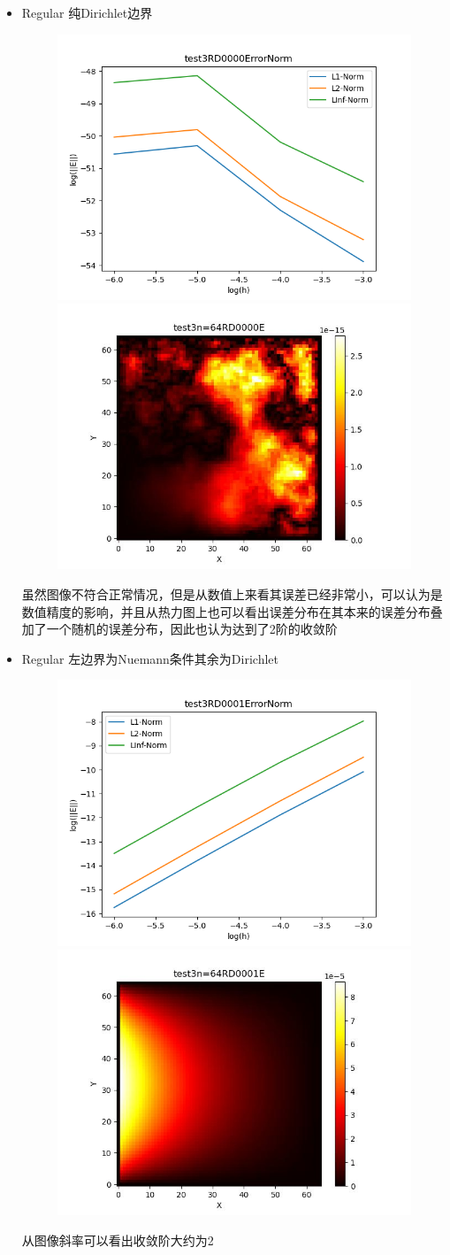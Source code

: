 \documentclass{article}
\begin{document}
\begin{itemize}
    \newpage
    \item Regular 纯Dirichlet边界
    \begin{figure}[h]
        \centering
        \includegraphics[width=0.35\linewidth]{test3RD0000ErrorNormjpg.png}
        \includegraphics[width=0.35\linewidth]{test3n=64RD0000E.jpg}
    \end{figure}
    
    虽然图像不符合正常情况，但是从数值上来看其误差已经非常小，可以认为是数值精度的影响，并且从热力图上也可以看出误差分布在其本来的误差分布叠加了一个随机的误差分布，因此也认为达到了2阶的收敛阶
    \item Regular 左边界为Nuemann条件其余为Dirichlet
    \begin{figure}[h]
        \centering
        \includegraphics[width=0.35\linewidth]{test3RD0001ErrorNormjpg.png}
        \includegraphics[width=0.35\linewidth]{test3n=64RD0001E.jpg}
    \end{figure}

    从图像斜率可以看出收敛阶大约为2
    

\end{itemize}
\end{document}
